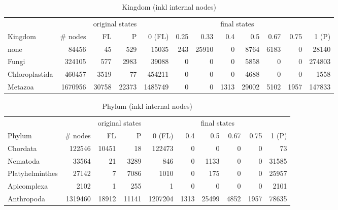       \begin{table}
        \begin{center}
          \hspace*{-2cm}\begin{tabular}{ |l|r||r|r||r|r|r|r|r|r|r|r| }
            \hline
            & & \multicolumn{2}{c||}{original states} & \multicolumn{8}{c|}{final states} \\
            Kingdom & \# nodes & FL & P
              & 0 (FL) & 0.25 & 0.33 & 0.4 & 0.5 & 0.67 & 0.75 & 1 (P) \\
            \hline \hline
            none & 84456 & 45 & 529 
              & 15035 & 243 & 25910 & 0 & 8764 & 6183 & 0 & 28140 \\
            Fungi & 324105 & 577 & 2983
              & 39088 & 0 & 0 & 0 & 5858 & 0 & 0 & 274803 \\
            Chloroplastida & 460457 & 3519 & 77
              & 454211 & 0 & 0 & 0 & 4688 & 0 & 0 & 1558 \\
            Metazoa & 1670956 & 30758 & 22373
              & 1485749 & 0 & 0 & 1313 & 29002 & 5102 & 1957 & 147833 \\
            \hline  
          \end{tabular}
        \end{center}
        \caption{Kingdom (inkl internal nodes)}
      \end{table}

      \begin{table}
        \begin{center}
          \begin{tabular}{ |l|r||r|r||r|r|r|r|r|r| }
            \hline
            & & \multicolumn{2}{c||}{original states} & \multicolumn{6}{c|}{final states} \\
            Phylum & \# nodes & FL & P
              & 0 (FL) & 0.4 & 0.5 & 0.67 & 0.75 & 1 (P) \\
            \hline \hline
            Chordata & 122546 & 10451 & 18 
              & 122473 & 0 & 0 & 0 & 0 & 73 \\
            Nematoda & 33564 & 21 & 3289 
              & 846 & 0 & 1133 & 0 & 0 & 31585 \\
            Platyhelminthes & 27142 & 7 & 7086 
              & 1010 & 0 & 175 & 0 & 0 & 25957 \\
            Apicomplexa & 2102 & 1 & 255 
              & 1 & 0 & 0 & 0 & 0 & 2101 \\
            \hline
            Anthropoda & 1319460 & 18912 & 11141 
              & 1207204 & 1313 & 25499 & 4852 & 1957 & 78635 \\
            \hline
          \end{tabular}
        \end{center}
        \caption{Phylum (inkl internal nodes)}
      \end{table}


